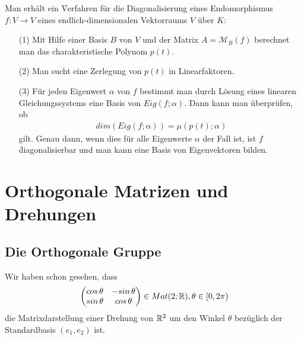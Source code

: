 Man erhält ein \f{Verfahren} für die Diagonalisierung eines Endomorphismus $f: V \rightarrow V$ eines endlich-dimensionalen Vektorraums $V$ über $K$:
\begin{itemize}
\item[(1)] Mit Hilfe einer Basis $B$ von $V$ und der Matrix $A = \mathcal{M}_B(f)$ berechnet man das charakteristische Polynom $p(t)$.
\item[(2)] Man sucht eine Zerlegung von $p(t)$ in Linearfaktoren.
\item[(3)] Für jeden Eigenwert $\alpha$ von $f$ bestimmt man durch Lösung eines linearen Gleichungssystems eine Basis von $Eig(f; \alpha)$. Dann kann man überprüfen, ob
\begin{align}
dim(Eig(f; \alpha)) = \mu(p(t); \alpha)
\end{align}
gilt. Genau dann, wenn dies für alle Eigenwerte $\alpha$ der Fall ist, ist $f$ \f{diagonalisierbar} und man kann eine Basis von Eigenvektoren bilden.
\end{itemize}

\chapter{Orthogonale Matrizen und Drehungen}
\section{Die Orthogonale Gruppe}
Wir haben schon gesehen, dass 
\begin{align}
\begin{pmatrix} cos\, \theta & -sin\, \theta \\ sin\, \theta & cos\, \theta \end{pmatrix} \in Mat(2; \mathbb{R}), \theta \in [0, 2\pi)
\end{align}
die Matrixdarstellung einer Drehung von $\mathbb{R}^2$ um den Winkel $\theta$ bezüglich der Standardbasis $(e_1, e_2)$ ist.

